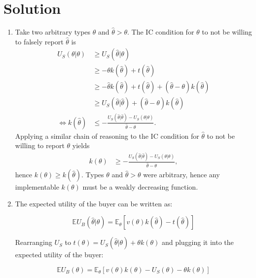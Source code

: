 \documentclass[a4paper]{article}
\newif\ifsolutions
\begin{document}
\ifsolutions
\section*{Solution}
\begin{enumerate}
	\item Take two arbitrary types $\theta$ and $\hat{\theta}>\theta$. The IC condition for $\theta$ to not be willing to falsely report $\hat{\theta}$ is
	\begin{align*}
		U_S(\theta|\theta) &\geq U_S (\hat{\theta}|\theta)
		\\
		&\geq -\theta k(\hat{\theta}) + t(\hat{\theta})
		\\
		&\geq -\hat{\theta} k(\hat{\theta}) + t(\hat{\theta}) + (\hat{\theta}-\theta) k(\hat{\theta})
		\\
		&\geq U_S (\hat{\theta}|\hat{\theta}) + (\hat{\theta}-\theta) k(\hat{\theta})
		\\
		\iff k(\hat{\theta}) &\leq - \frac{U_S(\hat{\theta}|\hat{\theta})-U_S(\theta|\theta)}{\hat{\theta}-\theta}.
	\end{align*}
	Applying a similar chain of reasoning to the IC condition for $\hat{\theta}$ to not be willing to report $\theta$ yields
	\begin{align*}
		k({\theta}) &\geq - \frac{U_S(\hat{\theta}|\hat{\theta})-U_S(\theta|\theta)}{\hat{\theta}-\theta},
	\end{align*}
	hence $k(\theta) \geq k(\hat{\theta})$. Types $\theta$ and $\hat{\theta}>\theta$ were arbitrary, hence any implementable $k(\theta)$ must be a weakly decreasing function.
	
	
	\item The expected utility of the buyer can be written as:
	
	$$ \mathbb{E}U_B(\hat{\theta}|\theta)=\mathbb{E}_\theta[v(\theta)k(\hat{\theta})-t(\hat{\theta})]$$
	
	Rearranging $U_S$ to $t(\theta)=U_S(\hat{\theta}|\theta)+\theta k(\theta)$ and plugging it into the expected utility of the buyer:
	
	$$ \mathbb{E}U_B(\theta)=\mathbb{E}_\theta[v(\theta)k(\theta)-U_S(\theta)-\theta k(\theta)]$$
	

\end{enumerate}
\end{document}
